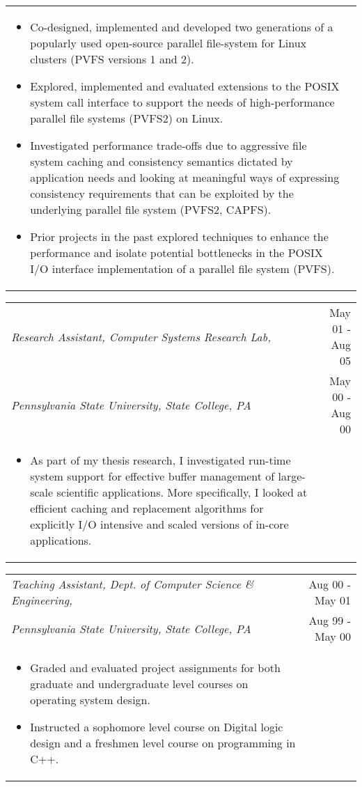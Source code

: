 \documentclass{article}
\begin{document}
\begin{center}
\begin{tabularx}{6.2in}{Xr}
	\begin{itemize}
	\small
        \item {Co-designed, implemented and developed two generations of a popularly used open-source parallel file-system
           for Linux clusters (PVFS versions 1 and 2).}
	\item {Explored, implemented and evaluated extensions to the POSIX system call interface to support the needs
	   of high-performance parallel file systems (PVFS2) on Linux.}
	\item {Investigated performance trade-offs due to 
	aggressive file system caching and consistency semantics dictated by application needs and looking
	at meaningful ways of expressing consistency requirements that can be exploited by the underlying
	parallel file system (PVFS2, CAPFS).} 
	\item {Prior projects in the past explored techniques to enhance the performance and isolate 
	potential bottlenecks in the POSIX I/O 
	interface implementation of a parallel file system (PVFS).} 
	\end{itemize}
	\end{tabularx}

\vspace*{-0.1truein}
	\normalsize
	\begin{tabularx}{6.2in}{Xr}
	\emph{Research Assistant, Computer Systems Research Lab,} & May 01 - Aug 05 \\
	\emph{Pennsylvania State University, State College, PA}  & May 00 - Aug 00 \\
	\begin{itemize}
	\small
	\item {As part of my thesis research, I investigated run-time system support for effective
	 buffer management of large-scale scientific applications. More specifically, I
	 looked at efficient caching and replacement algorithms for explicitly I/O intensive
	 and scaled versions of in-core applications.}
	\end{itemize}
	\end{tabularx}

\vspace*{-0.1truein}
  	\normalsize
	\begin{tabularx}{6.2in}{Xr}
	\emph{Teaching Assistant, Dept. of Computer Science \& Engineering,} & Aug 00 - May 01	\\
	\emph{Pennsylvania State University, State College, PA} & Aug 99 - May 00 \\
	\begin{itemize}
	\small
	\item {Graded and evaluated project assignments for both graduate and undergraduate level courses on 
	operating system design.}
	\item {Instructed a sophomore level course on Digital logic design and a freshmen level course on 
	programming in C++.}
	\end{itemize}
	\end{tabularx}


\end{center}
\end{document}
